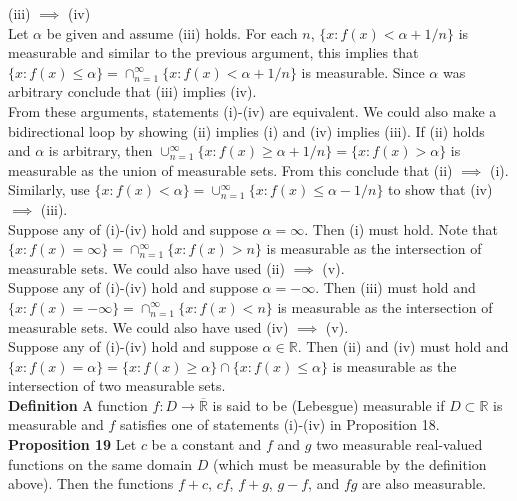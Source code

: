 \documentclass[a4paper]{article}
\begin{document}
(iii) $\implies$ (iv)\\
Let $\alpha$ be given and assume (iii) holds. For each $n$, $\{x : f(x) < \alpha + 1/n \}$ is measurable and similar to the previous argument, this implies that $\{x : f(x) \leq \alpha \} = \cap_{n=1}^\infty \{x : f(x) < \alpha + 1/n\}$ is measurable. Since $\alpha$ was arbitrary conclude that (iii) implies (iv). \\

From these arguments, statements (i)-(iv) are equivalent. We could also make a bidirectional loop by showing (ii) implies (i) and (iv) implies (iii). If (ii) holds and $\alpha$ is arbitrary, then $\cup_{n=1}^\infty \{x : f(x) \geq \alpha + 1/n\} = \{x: f(x) > \alpha\}$ is measurable as the union of measurable sets. From this conclude that (ii) $\implies $ (i). Similarly, use $\{x : f(x) < \alpha\} = \cup_{n=1}^\infty \{x : f(x) \leq \alpha - 1/n\}$ to show that (iv) $\implies$ (iii). \\

Suppose any of (i)-(iv) hold and suppose $\alpha = \infty$. Then (i) must hold. Note that $\{x : f(x) = \infty \} = \cap_{n=1}^\infty \{x : f(x) > n\}$ is measurable as the intersection of measurable sets. We could also have used (ii) $\implies$ (v). \\

Suppose any of (i)-(iv) hold and suppose $\alpha = -\infty$. Then (iii) must hold and $\{x : f(x) = -\infty\} = \cap_{n=1}^\infty \{x : f(x) < n\}$ is measurable as the intersection of measurable sets. We could also have used (iv) $\implies$ (v). \\

Suppose any of (i)-(iv) hold and suppose $\alpha \in \mathbb{R}$. Then (ii) and (iv) must hold and $\{x: f(x) = \alpha\} = \{x : f(x) \geq \alpha \} \cap \{x : f(x) \leq \alpha \}$ is measurable as the intersection of two measurable sets. \\

{\bf Definition} A function $f: D \rightarrow \overline{\mathbb{R}}$ is said to be (Lebesgue) measurable if $D \subset \mathbb{R}$ is measurable and $f$ satisfies one of statements (i)-(iv) in Proposition 18. \\

{\bf Proposition 19} Let $c$ be a constant and $f$ and $g$ two measurable real-valued functions on the same domain $D$ (which must be measurable by the definition above). Then the functions $f+c$, $cf$, $f+g$, $g-f$, and $fg$ are also measurable. \\
\end{document}
